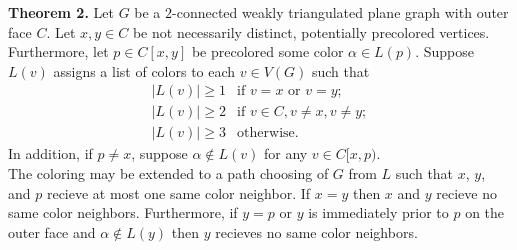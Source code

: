 \documentclass[11pt,letter]{article}
\begin{document}
\begin{adjustwidth}{1.5em}{1.5em}
\noindent\textbf{Theorem 2.} Let $G$ be a $2$-connected weakly triangulated plane graph with outer face $C$.
Let $x,y\in C$ be not necessarily distinct, potentially precolored vertices. Furthermore, let $p\in C[x,y]$ be
precolored some color $\alpha\in L(p)$. Suppose $L(v)$ assigns a list of colors to each $v\in V(G)$ such that
\[
    \begin{array}{ll}
	    |L(v)|\ge 1 & \text{if } v=x \text{ or } v=y;\\
	    |L(v)|\ge 2 & \text{if } v\in C, v\ne x, v\ne y;\\
	    |L(v)|\ge 3 & \text{otherwise.}
    \end{array}
\]
In addition, if $p\ne x$, suppose $\alpha\not\in L(v)$ for any $v\in C[x,p)$.\\

\noindent The coloring may be extended to
a path choosing of $G$ from $L$ such that $x$, $y$, and $p$ recieve at most one same color neighbor. If
$x=y$ then $x$ and $y$ recieve no same color neighbors. Furthermore, if $y=p$ or $y$ is immediately prior to
$p$ on the outer face and $\alpha\not\in L(y)$ then $y$ recieves no same color neighbors.\\
\end{adjustwidth}
\end{document}
